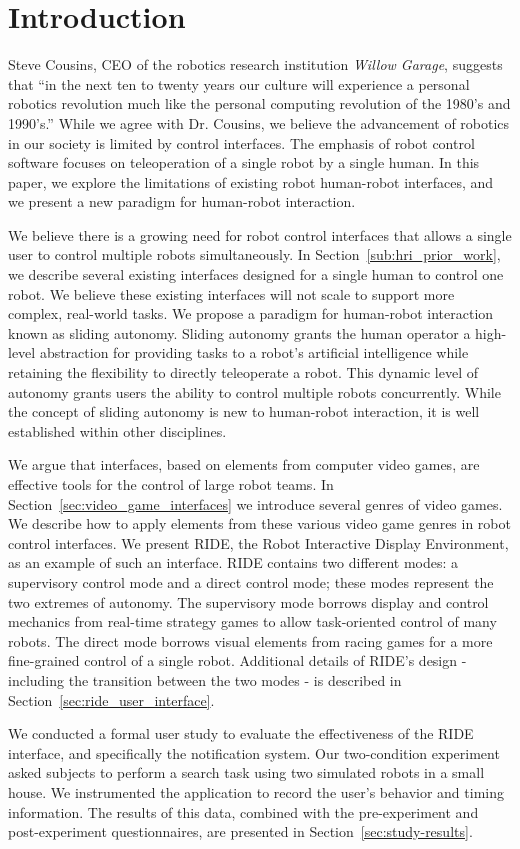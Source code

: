 \chapter{Introduction}
Steve Cousins, CEO of the robotics research institution \emph{Willow Garage}, suggests that ``in the next ten to twenty years our culture will experience a personal robotics revolution much like the personal computing revolution of the 1980's and 1990's.'' \cite{Cousins} While we agree with Dr. Cousins, we believe the advancement of robotics in our society is limited by control interfaces. The emphasis of robot control software focuses on teleoperation of a single robot by a single human. In this paper, we explore the limitations of existing robot human-robot interfaces, and we present a new paradigm for human-robot interaction.

We believe there is a growing need for robot control interfaces that allows a single user to control multiple robots simultaneously. In Section~\ref{sub:hri_prior_work}, we describe several existing interfaces designed for a single human to control one robot. We believe these existing interfaces will not scale to support more complex, real-world tasks. We propose a paradigm for human-robot interaction known as sliding autonomy. Sliding autonomy grants the human operator a high-level abstraction for providing tasks to a robot's artificial intelligence while retaining the flexibility to directly teleoperate a robot. This dynamic level of autonomy grants users the ability to control multiple robots concurrently. While the concept of sliding autonomy is new to human-robot interaction, it is well established within other disciplines.

We argue that interfaces, based on elements from computer video games, are effective tools for the control of large robot teams. In Section~\ref{sec:video_game_interfaces} we introduce several genres of video games. We describe how to apply elements from these various video game genres in robot control interfaces. We present RIDE, the Robot Interactive Display Environment, as an example of such an interface. RIDE contains two different modes: a supervisory control mode and a direct control mode; these modes represent the two extremes of autonomy. The supervisory mode borrows display and control mechanics from real-time strategy games to allow task-oriented control of many robots. The direct mode borrows visual elements from racing games for a more fine-grained control of a single robot. Additional details of RIDE's design - including the transition between the two modes - is described in Section~\ref{sec:ride_user_interface}.

We conducted a formal user study to evaluate the effectiveness of the RIDE interface, and specifically the notification system. Our two-condition experiment asked subjects to perform a search task using two simulated robots in a small house. We instrumented the application to record the user's behavior and timing information. The results of this data, combined with the pre-experiment and post-experiment questionnaires, are presented in Section~\ref{sec:study-results}.
